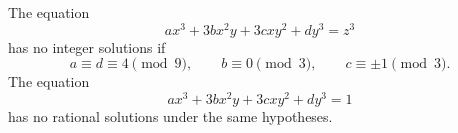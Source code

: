 \begin{proposition}
    The equation
\[
    ax^3+3bx^2y+3cxy^2+dy^3=z^3
\]
    has no integer solutions if
\[
    a\equiv d\equiv4\pmod9,\qquad b\equiv0\pmod3,\qquad c\equiv\pm1\pmod3.
\]
    The equation
\[
    ax^3+3bx^2y+3cxy^2+dy^3=1
\]
    has no rational solutions under the same hypotheses.
\end{proposition}
